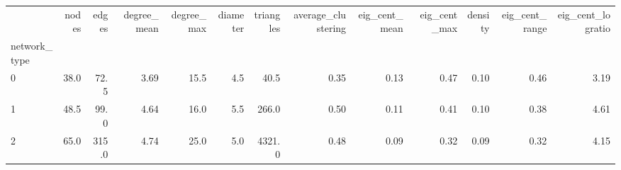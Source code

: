 \begin{tabular}{lrrrrrrrrrrrr}
\toprule
{} &  nodes &  edges &  degree\_mean &  degree\_max &  diameter &  triangles &  average\_clustering &  eig\_cent\_mean &  eig\_cent\_max &  density &  eig\_cent\_range &  eig\_cent\_logratio \\
network\_type &        &        &              &             &           &            &                     &                &               &          &                 &                    \\
\midrule
0            &   38.0 &   72.5 &         3.69 &        15.5 &       4.5 &       40.5 &                0.35 &           0.13 &          0.47 &     0.10 &            0.46 &               3.19 \\
1            &   48.5 &   99.0 &         4.64 &        16.0 &       5.5 &      266.0 &                0.50 &           0.11 &          0.41 &     0.10 &            0.38 &               4.61 \\
2            &   65.0 &  315.0 &         4.74 &        25.0 &       5.0 &     4321.0 &                0.48 &           0.09 &          0.32 &     0.09 &            0.32 &               4.15 \\
\bottomrule
\end{tabular}

